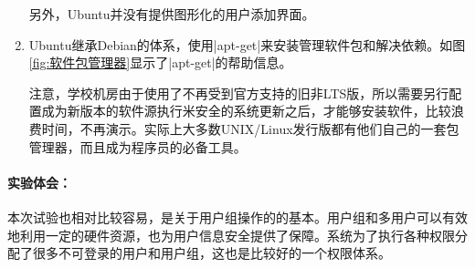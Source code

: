\documentclass[cs4size,a4paper,nofonts]{ctexart}
\begin{document}
\begin{enumerate}
另外，Ubuntu并没有提供图形化的用户添加界面。

\begin{figure}[htp]
\end{figure}

\item Ubuntu继承Debian的体系，使用|apt-get|来安装管理软件包和解决依赖。如图\ref{fig:软件包管理器}显示了|apt-get|的帮助信息。

注意，学校机房由于使用了不再受到官方支持的旧非LTS版，所以需要另行配置成为新版本的软件源执行米安全的系统更新之后，才能够安装软件，比较浪费时间，不再演示。实际上大多数UNIX/Linux发行版都有他们自己的一套包管理器，而且成为程序员的必备工具。

\end{enumerate}

\paragraph{实验体会：}\quad

本次试验也相对比较容易，是关于用户组操作的的基本。用户组和多用户可以有效地利用一定的硬件资源，也为用户信息安全提供了保障。系统为了执行各种权限分配了很多不可登录的用户和用户组，这也是比较好的一个权限体系。
\end{document}
